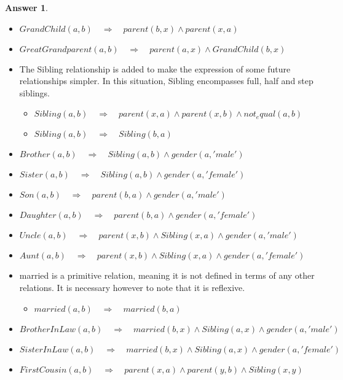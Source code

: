 \documentclass[a4paper]{article}
\renewcommand{\(}{\left(}
\renewcommand{\)}{\right)}
\theoremstyle{plain}
\theoremstyle{plain}
\theoremstyle{definition}
\newtheorem*{answer}{Answer}
\begin{document}
\begin{shaded}
\begin{answer}
$$ $$
\begin{itemize}
  \item $ GrandChild(a,b) \quad \Rightarrow \quad parent(b,x) \wedge parent(x,a) $
  \item $ GreatGrandparent(a,b) \quad \Rightarrow \quad parent(a,x) \wedge GrandChild(b,x) $
  \item The Sibling relationship is added to make the expression of some future relationships simpler. In this situation, Sibling encompasses full, half and step siblings.
      \begin{itemize}
        \item $ Sibling(a,b) \quad \Rightarrow \quad  parent(x,a) \wedge parent(x,b) \wedge not_equal(a,b) $
        \item $ Sibling(a,b) \quad \Rightarrow \quad Sibling(b,a) $
      \end{itemize}
  \item $Brother(a,b) \quad \Rightarrow \quad Sibling(a,b) \wedge gender(a,'male')$
  \item $Sister(a,b) \quad \Rightarrow \quad Sibling(a,b) \wedge gender(a,'female')$
  \item $Son(a,b) \quad \Rightarrow \quad parent(b,a) \wedge gender(a,'male')$
  \item $ Daughter(a,b) \quad \Rightarrow \quad parent(b,a) \wedge gender(a,'female')$
  \item $ Uncle(a,b) \quad \Rightarrow \quad parent(x,b) \wedge Sibling(x,a) \wedge gender(a,'male') $
  \item $ Aunt(a,b) \quad \Rightarrow \quad parent(x,b) \wedge Sibling(x,a) \wedge gender(a,'female') $
  \item married is a primitive relation, meaning it is not defined in terms of any other relations. It is necessary however to note that it is reflexive.
      \begin{itemize}
        \item $married(a,b) \quad \Rightarrow \quad married(b,a)$
      \end{itemize}
  \item $ BrotherInLaw(a,b) \quad \Rightarrow \quad married(b,x) \wedge Sibling(a,x) \wedge gender(a,'male') $
  \item $ SisterInLaw(a,b) \quad \Rightarrow \quad married(b,x) \wedge Sibling(a,x) \wedge gender(a,'female') $
  \item $ FirstCousin(a,b) \quad \Rightarrow \quad parent(x,a) \wedge parent(y,b) \wedge Sibling(x,y) $
\end{itemize}
\end{answer}
\end{shaded}
\end{document}
